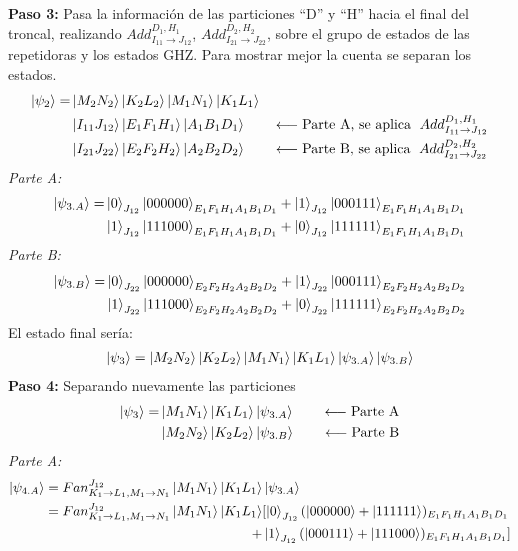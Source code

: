 \textbf{Paso 3:} Pasa la información de las particiones ``D'' y ``H'' hacia el final del troncal, realizando $Add^{D_1 , H_1}_{I_{11}  \rightarrow J_{12}}$, $Add^{D_2 , H_2}_{I_{21}  \rightarrow J_{22}}$, sobre el grupo de estados de las repetidoras y los estados GHZ. Para mostrar mejor la cuenta se separan los estados.
\begin{align*}
\ket{\psi_{2}} = & \ket{M_2 N_2}\ket{K_2 L_2}\ket{M_1 N_1} \ket{K_1 L_1} \\
& \ket{I_{11} J_{12}}  \ket{E_1 F_1 H_1} \ket{A_1 B_1 D_1}
\qquad  \longleftarrow \text{Parte A, se aplica } \; Add^{D_1 , H_1}_{I_{11}  \rightarrow J_{12}} \\
& \ket{I_{21} J_{22}}  \ket{E_2 F_2 H_2} \ket{A_2 B_2 D_2} 
\qquad  \longleftarrow \text{Parte B, se aplica } \; Add^{D_2 , H_2}_{I_{21}  \rightarrow J_{22}} 
\end{align*}
\textit{Parte A:}
\begin{align*}
\ket{\psi_{3.A}} = & \ket{0}_{J_{12}}\ket{000000}_{E_1 F_1 H_1 A_1 B_1 D_1}+\ket{1}_{J_{12}}\ket{000111}_{E_1 F_1 H_1 A_1 B_1 D_1} \\
& \ket{1}_{J_{12}}\ket{111000}_{E_1 F_1 H_1 A_1 B_1 D_1}+\ket{0}_{J_{12}}\ket{111111}_{E_1 F_1 H_1 A_1 B_1 D_1}
\end{align*}
\textit{Parte B:}
\begin{align*}
\ket{\psi_{3.B}} = 
& \ket{0}_{J_{22}}\ket{000000}_{E_2 F_2 H_2 A_2 B_2 D_2}+\ket{1}_{J_{22}}\ket{000111}_{E_2 F_2 H_2 A_2 B_2 D_2} \\
& \ket{1}_{J_{22}}\ket{111000}_{E_2 F_2 H_2 A_2 B_2 D_2}+\ket{0}_{J_{22}}\ket{111111}_{E_2 F_2 H_2 A_2 B_2 D_2}
\end{align*}
El estado final sería:
\begin{align*}
\ket{\psi_3} = \ket{M_2 N_2}\ket{K_2 L_2}\ket{M_1 N_1}\ket{K_1 L_1}\ket{\psi_{3.A}}\ket{\psi_{3.B}}
\end{align*}
\textbf{Paso 4:} Separando nuevamente las particiones
\begin{align*}
\ket{\psi_3} =& \ket{M_1 N_1}\ket{K_1 L_1}\ket{\psi_{3.A}} 
                \qquad  \longleftarrow \text{Parte A} \\ 
              & \ket{M_2 N_2}\ket{K_2 L_2}\ket{\psi_{3.B}}
                \qquad  \longleftarrow \text{Parte B} 
\end{align*}
\textit{Parte A:}
\begin{align*}
\ket{\psi_{4.A}} = Fan^{J_{12}}_{K_1  \rightarrow L_1 , M_1  \rightarrow N_1} \ket{M_1 N_1}\ket{K_1 L_1} & \ket{\psi_{3.A}} \\
=  Fan^{J_{12}}_{K_1  \rightarrow L_1 , M_1  \rightarrow N_1} \ket{M_1 N_1}\ket{K_1 L_1}
&[ \ket{0}_{J_{12}}(\ket{000000}+\ket{111111})_{E_1 F_1 H_1 A_1 B_1 D_1} \\
 +&\ket{1}_{J_{12}}(\ket{000111}+\ket{111000})_{E_1 F_1 H_1 A_1 B_1 D_1}]
\end{align*}
